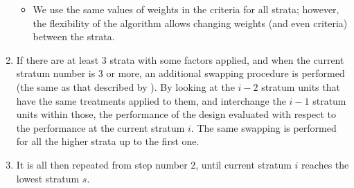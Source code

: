 \begin{enumerate}
\begin{itemize}
\item We use the same values of weights in the criteria for all strata; however, the flexibility of the algorithm allows changing weights (and even criteria) between the strata.
\end{itemize}
\item If there are at least $3$ strata with some factors applied, and when the current stratum number is $3$ or more, an additional swapping procedure is performed (the same as that described by \cite{Trinca2001multistratum}). By looking at the $i-2$ stratum units that have the same treatments applied to them, and interchange the $i-1$ stratum units within those, the performance of the design evaluated with respect to the performance at the current stratum $i$. The same swapping is performed for all the higher strata up to the first one.
\item It is all then repeated from step number $2$, until current stratum $i$ reaches the lowest stratum $s$. 
\end{enumerate}